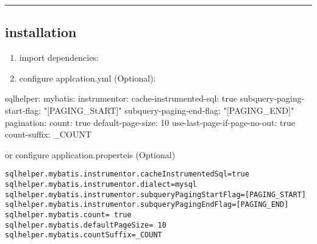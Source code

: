 \documentclass[
]{book}
\newenvironment{Shaded}{\begin{snugshade}}{\end{snugshade}}
\newcommand{\AttributeTok}[1]{\textcolor[rgb]{0.77,0.63,0.00}{#1}}
\newcommand{\CharTok}[1]{\textcolor[rgb]{0.31,0.60,0.02}{#1}}
\newcommand{\DecValTok}[1]{\textcolor[rgb]{0.00,0.00,0.81}{#1}}
\newcommand{\FunctionTok}[1]{\textcolor[rgb]{0.00,0.00,0.00}{#1}}
\newcommand{\KeywordTok}[1]{\textcolor[rgb]{0.13,0.29,0.53}{\textbf{#1}}}
\newcommand{\NormalTok}[1]{#1}
\newcommand{\StringTok}[1]{\textcolor[rgb]{0.31,0.60,0.02}{#1}}
\begin{document}
\begin{center}\rule{0.5\linewidth}{0.5pt}\end{center}

\hypertarget{sqlhelper_mybatisplus_springboot_installation}{%
\subsection{installation}\label{sqlhelper_mybatisplus_springboot_installation}}

\begin{enumerate}
\def\labelenumi{\arabic{enumi}.}
\item
  import dependencies:

\begin{Shaded}
\end{Shaded}
\item
  configure applcation.yml (Optional):
\end{enumerate}

\begin{Shaded}
\begin{Highlighting}[]
\FunctionTok{sqlhelper:}
  \FunctionTok{mybatis:}
    \FunctionTok{instrumentor:}
      \FunctionTok{cache-instrumented-sql:}\AttributeTok{ }\CharTok{true}
      \FunctionTok{subquery-paging-start-flag:}\AttributeTok{ }\StringTok{"[PAGING_StART]"}
      \FunctionTok{subquery-paging-end-flag:}\AttributeTok{ }\StringTok{"[PAGING_END]"}
    \FunctionTok{pagination:}
      \FunctionTok{count:}\AttributeTok{ }\CharTok{true}
      \FunctionTok{default-page-size:}\AttributeTok{ }\DecValTok{10}
      \FunctionTok{use-last-page-if-page-no-out:}\AttributeTok{ }\CharTok{true}
      \FunctionTok{count-suffix:}\AttributeTok{ _COUNT}
\end{Highlighting}
\end{Shaded}

or configure application.properteis (Optional)

\begin{verbatim}
sqlhelper.mybatis.instrumentor.cacheInstrumentedSql=true
sqlhelper.mybatis.instrumentor.dialect=mysql
sqlhelper.mybatis.instrumentor.subqueryPagingStartFlag=[PAGING_START]
sqlhelper.mybatis.instrumentor.subqueryPagingEndFlag=[PAGING_END]
sqlhelper.mybatis.count= true
sqlhelper.mybatis.defaultPageSize= 10
sqlhelper.mybatis.countSuffix=_COUNT
\end{verbatim}
\end{document}
